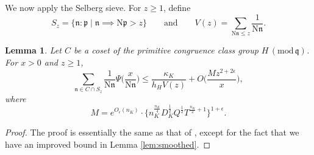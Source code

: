 \documentclass[12pt,psamsfonts]{amsart}
\newtheorem{lem}[thm]{Lemma}
\theoremstyle{definition}
\theoremstyle{remark}
\numberwithin{equation}{section}
\theoremstyle{plain}
\theoremstyle{remark}
\renewcommand{\1}{ {\bf 1}}
\renewcommand{\pmod}[1]{\, (\mathrm{mod} {\, #1})}
\newcommand{\kn}{\mathfrak{n}}
\newcommand{\N}{\mathrm{N}}
\newcommand{\kp}{\mathfrak{p}}
\newcommand{\kq}{\mathfrak{q}}
\begin{document}
We now apply the Selberg sieve.  For $z\geq 1$, define
\begin{equation}
S_z=\{\kn:\kp\mid\kn\implies\N\kp>z\} \qquad \text{and} \qquad V(z)=\sum_{\N\kn\leq z}\frac{1}{\N\kn}.	
\end{equation}


 
\begin{lem}
\label{lem:3.3}
Let $C$ be a coset of the primitive congruence class group $H\pmod{\kq}$.  For $x > 0$ and $z \geq 1$,  
\[
\sum_{\kn\in C\cap S_z}\frac{1}{\N\kn} \Psi\Big(\frac{x}{\N\kn}\Big)\leq \frac{\kappa_K}{h_H V(z)}+O\Big( \frac{M z^{2+2\epsilon}}{x} \Big),
\]
where
\begin{equation}
M=e^{O_{{\epsilon}}(n_K)} \cdot \big\{ n_K^{\frac{n_K}{4}} D_K^{\tfrac{1}{2}} Q^{\tfrac{1}{2}} T^{\tfrac{n_K}{2}+1} \big\}^{1+\epsilon}.
\label{def:M}
\end{equation}
\end{lem}
\begin{proof}
The proof is essentially the same as that of \cite[Lemma 3.6]{Weiss}, except for the fact that we have an improved bound in Lemma \ref{lem:smoothed}.
\end{proof}
\end{document}
